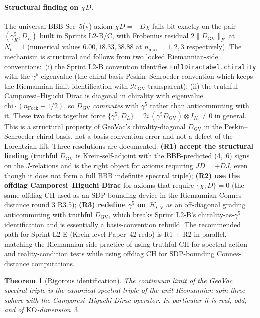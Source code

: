 \documentclass[11pt]{article}
\newtheorem{theorem}{Theorem}
\begin{document}
\paragraph{Structural finding on $\chi D$.}
The universal BBB Sec~5(v) axiom $\chi D = -D \chi$ fails bit-exactly
on the pair $(\gamma^5_K, D_L)$ built in Sprints L2-B/C, with Frobenius
residual $2\|D_{\mathrm{GV}}\|_F$ at $N_t = 1$ (numerical values
$6.00, 18.33, 38.88$ at $n_{\max} = 1, 2, 3$ respectively).  The
mechanism is structural and follows from two locked Riemannian-side
conventions:\ (i) the Sprint L2-B convention identifies
\verb|FullDiracLabel.chirality| with the $\gamma^5$ eigenvalue (the
chiral-basis Peskin--Schroeder convention which keeps the Riemannian
limit identification with $\mathcal{H}_{\mathrm{GV}}$ transparent);
(ii) the truthful Camporesi--Higuchi Dirac is diagonal in
$\mathrm{chirality}$ with eigenvalue $\mathrm{chi} \cdot
(n_{\mathrm{Fock}} + 1/2)$, so $D_{\mathrm{GV}}$ \emph{commutes} with
$\gamma^5$ rather than anticommuting with it.  These two facts together
force $\{\gamma^5, D_L\} = 2i\,(\gamma^5 D_{\mathrm{GV}}) \otimes
I_{N_t} \neq 0$ in general.  This is a structural property of
GeoVac's chirality-diagonal $D_{\mathrm{GV}}$ in the Peskin--Schroeder
chiral basis, not a basis-convention error and not a defect of the
Lorentzian lift.  Three resolutions are documented:
\textbf{(R1) accept the structural finding} (truthful $D_{\mathrm{GV}}$
is Krein-self-adjoint with the BBB-predicted (4,~6) signs on the
$J$-relations and is the right object for axioms requiring
$JD = +DJ$, even though it does not form a full BBB indefinite
spectral triple);
\textbf{(R2) use the offdiag Camporesi--Higuchi Dirac} for axioms that
require $\{\chi, D\} = 0$ (the same offdiag CH used as an SDP-bounding
device in the Riemannian Connes-distance round 3 R3.5);
\textbf{(R3) redefine $\gamma^5$ on $\mathcal{H}_{\mathrm{GV}}$} as an
off-diagonal grading anticommuting with truthful $D_{\mathrm{GV}}$,
which breaks Sprint L2-B's chirality-as-$\gamma^5$ identification and
is essentially a basis-convention rebuild.  The recommended path for
Sprint L2-E (Krein-level Paper~42 redo) is R1 + R2 in parallel,
matching the Riemannian-side practice of using truthful CH for
spectral-action and reality-condition tests while using offdiag CH for
SDP-bounding Connes-distance computations.

\begin{theorem}[Rigorous identification]
\label{thm:axiom_complete}
The continuum limit of the GeoVac spectral triple is the canonical
spectral triple of the unit Riemannian spin three-sphere with the
Camporesi--Higuchi Dirac operator.  In particular it is real, odd, and
of $\mathrm{KO}$-dimension~$3$.
\end{theorem}
\end{document}

